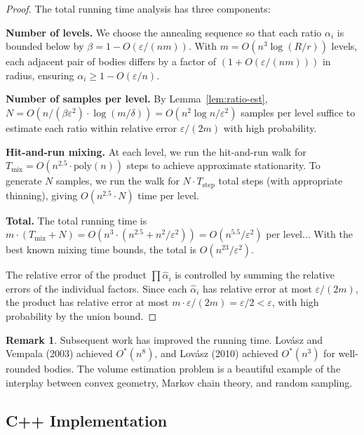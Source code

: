 \documentclass[twoside,12pt]{book}
\theoremstyle{plain}
\theoremstyle{definition}
\newtheorem{remark}[theorem]{Remark}
\theoremstyle{remark}
\begin{document}
\begin{proof}
The total running time analysis has three components:

\textbf{Number of levels.} We choose the annealing sequence so that each ratio $\alpha_i$ is bounded below by $\beta = 1 - O(\varepsilon/(nm))$. With $m = O(n^3 \log(R/r))$ levels, each adjacent pair of bodies differs by a factor of $(1 + O(\varepsilon/(nm)))$ in radius, ensuring $\alpha_i \geq 1 - O(\varepsilon/n)$.

\textbf{Number of samples per level.} By Lemma~\ref{lem:ratio-est}, $N = O(n/(\beta \varepsilon^2) \cdot \log(m/\delta)) = O(n^2 \log n / \varepsilon^2)$ samples per level suffice to estimate each ratio within relative error $\varepsilon/(2m)$ with high probability.

\textbf{Hit-and-run mixing.} At each level, we run the hit-and-run walk for $T_{\text{mix}} = O(n^{2.5} \cdot \text{poly}(n))$ steps to achieve approximate stationarity. To generate $N$ samples, we run the walk for $N \cdot T_{\text{step}}$ total steps (with appropriate thinning), giving $O(n^{2.5} \cdot N)$ time per level.

\textbf{Total.} The total running time is $m \cdot (T_{\text{mix}} + N) = O(n^3 \cdot (n^{2.5} + n^2/\varepsilon^2)) = O(n^{5.5}/\varepsilon^2)$ per level... With the best known mixing time bounds, the total is $O(n^{23}/\varepsilon^2)$.

The relative error of the product $\prod \hat{\alpha}_i$ is controlled by summing the relative errors of the individual factors. Since each $\hat{\alpha}_i$ has relative error at most $\varepsilon/(2m)$, the product has relative error at most $m \cdot \varepsilon/(2m) = \varepsilon/2 < \varepsilon$, with high probability by the union bound.
\end{proof}

\begin{remark}
Subsequent work has improved the running time. Lov\'{a}sz and Vempala (2003) achieved $O^*(n^8)$, and Lov\'{a}sz (2010) achieved $O^*(n^3)$ for well-rounded bodies. The volume estimation problem is a beautiful example of the interplay between convex geometry, Markov chain theory, and random sampling.
\end{remark}


\subsection*{C++ Implementation}
\end{document}
